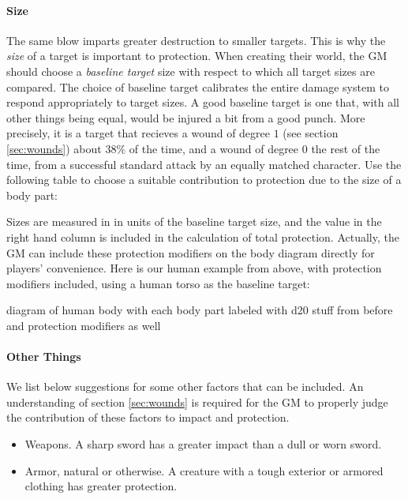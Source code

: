 \documentclass[12pt]{article}
\newcommand{\notes}[1]{{\color{Tan} #1}}
\newcommand{\emdex}[1]{\emph{#1}\index{#1}}
\begin{document}
\paragraph{Size}
The same blow imparts greater destruction to smaller targets. 
This is why the \emdex{size} of a target is important to protection.
When creating their world, the GM should choose a \emdex{baseline target}
size with respect to which all target sizes are compared.
The choice of baseline target calibrates the entire damage system to respond appropriately to target sizes.
A good baseline target is one that, with all other things being equal, would be injured a bit from a good punch.
More precisely, it is a target that recieves a wound of degree $1$ (see section \ref{sec:wounds}) about $38\%$
of the time, and a wound of degree $0$ the rest of the time, from a successful standard attack by an equally matched character.
Use the following table to choose a suitable contribution to protection due to the size of a body part:
\begin{center}

\end{center}
Sizes are measured in in units of the baseline target size,
and the value in the right hand column is included in the calculation of total protection.
Actually, the GM can include these protection modifiers on the body diagram
directly for players' convenience.
Here is our human example from above, with protection modifiers included,
using a human torso as the baseline target:

\notes{diagram of human body with each body part labeled with d20 stuff
from before and protection modifiers as well}

\paragraph{Other Things}
We list below suggestions for some other factors that can be included.
An understanding of section \ref{sec:wounds} is required for the GM to properly
judge the contribution of these factors to impact and protection.
\vspace{-1em}\begin{itemize}
\item Weapons. A sharp sword has a greater impact than a dull or worn sword.
\item Armor, natural or otherwise. A creature with a tough exterior or armored clothing has greater protection.
\end{itemize}
\end{document}
